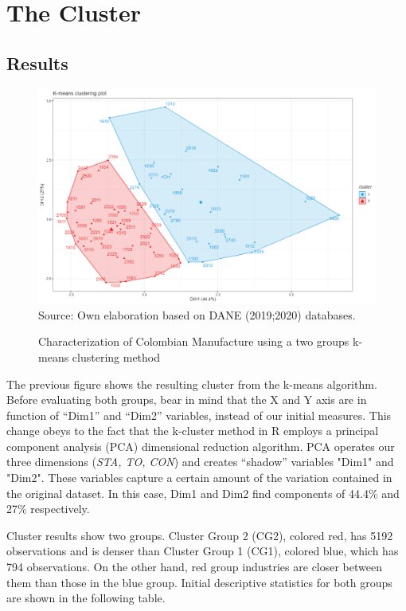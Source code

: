 \documentclass[12pt,a4paper]{article}
\begin{document}
\section{The Cluster}
\subsection{Results}
\begin{figure}[H]	
	\caption{Characterization of Colombian Manufacture using a two groups k-means clustering method}
	\centering
	\includegraphics[scale = 0.45]{cluster.png}
	Source: Own elaboration based on DANE (2019;2020) databases.
\end{figure}

The previous figure shows the resulting cluster from the k-means algorithm. Before evaluating both groups, bear in mind that the X and Y axis are in function of “Dim1” and “Dim2” variables, instead of our initial measures. This change obeys to the fact that the k-cluster method in R employs a principal component analysis (PCA) dimensional reduction algorithm. PCA operates our three dimensions (\textit{STA, TO, CON}) and creates “shadow” variables "Dim1" and "Dim2". These variables capture a certain amount of the variation contained in the original dataset. In this case, Dim1 and Dim2 find components of 44.4\% and 27\% respectively. 

Cluster results show two groups. Cluster Group 2 (CG2), colored red, has 5192 observations and is denser than Cluster Group 1 (CG1), colored blue, which has 794 observations. On the other hand, red group industries are closer between them than those in the blue group. Initial descriptive statistics for both groups are shown in the following table. 
\end{document}
